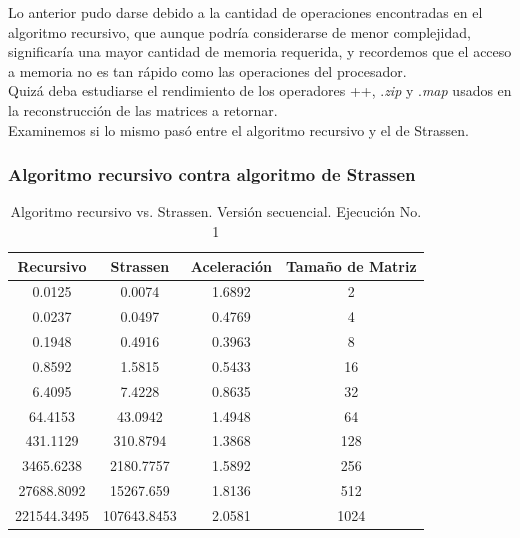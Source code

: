\documentclass{article}
\begin{document}
Lo anterior pudo darse debido a la cantidad de operaciones encontradas en el algoritmo recursivo, que aunque podría considerarse de menor complejidad, significaría una mayor cantidad de memoria requerida, y recordemos que el acceso a memoria no es tan rápido como las operaciones del procesador. \\ 

Quizá deba estudiarse el rendimiento de los operadores ++, .\textit{zip} y .\textit{map} usados en la reconstrucción de las matrices a retornar.\\

Examinemos si lo mismo pasó entre el algoritmo recursivo y el de Strassen.\\

\subsubsection{Algoritmo recursivo contra algoritmo de Strassen}

\begin{table}[ht]
\centering
\begin{tabular}{|c|c|c|c|}
\hline
\textbf{Recursivo} & \textbf{Strassen} & \textbf{Aceleración} & \textbf{Tamaño de Matriz} \\
\hline
0.0125 & 0.0074 & 1.6892 & 2 \\
0.0237 & 0.0497 & 0.4769 & 4 \\
0.1948 & 0.4916 & 0.3963 & 8 \\
0.8592 & 1.5815 & 0.5433 & 16 \\
6.4095 & 7.4228 & 0.8635 & 32 \\
64.4153 & 43.0942 & 1.4948 & 64 \\
431.1129 & 310.8794 & 1.3868 & 128 \\
3465.6238 & 2180.7757 & 1.5892 & 256 \\
27688.8092 & 15267.659 & 1.8136 & 512 \\
221544.3495 & 107643.8453 & 2.0581 & 1024 \\
\hline
\end{tabular}
\caption{Algoritmo recursivo vs. Strassen. Versión secuencial. Ejecución No. 1}
\end{table}
\end{document}
